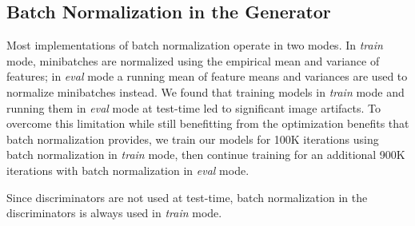 \documentclass[10pt,twocolumn,letterpaper]{article}
\begin{document}
\begin{table}
  \centering
  \setlength{\tabcolsep}{1mm}
  \vspace{1mm}
  \caption{
    Architecture of our Cascaded Refinement Network. CRM is a Cascaded Refinement Module,
    shown in Table~\ref{tab:crn-module}. LeakyReLU uses a negative slope of 0.2.
  }
  \label{tab:crn-net}
\end{table}

\subsection{Batch Normalization in the Generator}
Most implementations of batch normalization operate in two modes. In \emph{train} mode,
minibatches are normalized using the empirical mean and variance of features; in \emph{eval}
mode a running mean of feature means and variances are used to normalize minibatches instead.
We found that training models in \emph{train} mode and running them in \emph{eval} mode at
test-time led to significant image artifacts. To overcome this limitation while still
benefitting from the optimization benefits that batch normalization provides, we train
our models for 100K iterations using batch normalization in \emph{train} mode, then
continue training for an additional 900K iterations with batch normalization in \emph{eval}
mode.

Since discriminators are not used at test-time, batch normalization in the discriminators
is always used in \emph{train} mode.
\end{document}
